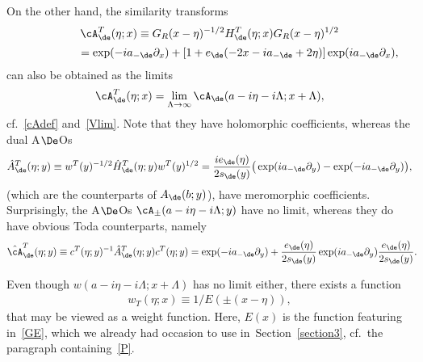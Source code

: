 \documentclass[pdftex]{sigma}
\numberwithin{equation}{section}
\begin{document}
On the other hand, the similarity transforms
\begin{gather}
\cA^{T}_{\de}(\eta;x)     \equiv       G_R(x-\eta)^{- 1/2} H^T_{\de}(\eta;x)  G_R(x-\eta)^{ 1/2}
\nonumber \\
\phantom{\cA^{T}_{\de}(\eta;x)}{}    =    \exp(-ia_{-\de}\partial_x)+[1+e_{\de}(-2x-ia_{-\de}+2\eta)]\exp(ia_{-\de}\partial_x),\label{cAT}
\end{gather}
can also be obtained as the limits
\begin{gather}
\cA^{T}_{\de}(\eta;x)= \lim_{\Lambda\to\infty} \cA_{\de}(a-i\eta-i\Lambda;x+\Lambda),
\end{gather}
cf.~\eqref{cAdef} and~\eqref{Vlim}. Note that they have holomorphic coef\/f\/icients, whereas the dual A$\De$Os
\begin{gather}
\hat{A}^T_{\de}(\eta;y)     \equiv    w^T(y)^{-1/2}\hat{H}^T_{\de}(\eta;y)w^T(y)^{1/2}
=    \frac{ie_{\de}(\eta)}{2s_{\de}(y)}\big(\exp(ia_{-\de}\partial_y)-\exp(-ia_{-\de}\partial_y)\big),\label{ATd}
\end{gather}
(which are the counterparts of $A_{\de}(b;y)$), have meromorphic coef\/f\/icients. Surprisingly, the A$\De$Os
$\cA_{\pm}(a-i\eta-i\Lambda;y)$ have no limit, whereas they do have obvious Toda counterparts, namely
\begin{gather}\label{cATd}
\hat{\cA}^T_{\de}(\eta;y)\equiv c^T(\eta;y)^{-1}\hat{A}^T_{\de}(\eta;y)c^T(\eta;y)=\exp(-ia_{-\de}\partial_y)
+\frac{e_{\de}(\eta)}{2s_{\de}(y)}\exp(ia_{-\de}\partial_y)\frac{e_{\de}(\eta)}{2s_{\de}(y)}.\!\!\!
\end{gather}

Even though $w(a-i\eta-i\Lambda;x+\Lambda)$ has no  limit either, there exists a function
\begin{gather}\label{wT}
w_T(\eta;x)\equiv 1/E(\pm (x-\eta)),
\end{gather}
 that may be viewed as a weight function. Here, $E(x)$ is the function  featuring in~\eqref{GE}, which we already had occasion to use in~Section~\ref{section3}, cf.~the paragraph containing~\eqref{P}.
\end{document}
